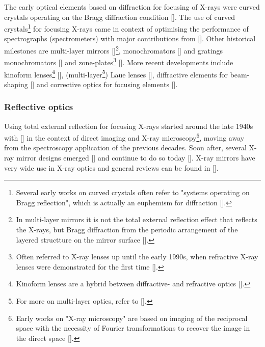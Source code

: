 \begin{refsection}
The early optical elements based on diffraction for focusing of X-rays were curved crystals operating on the Bragg diffraction condition [\cite{Gouy1916,Seemann1916}]. The use of curved crystals\footnote{Several early works on curved crystals often refer to "systems operating on Bragg reflection", which is actually an euphemism for diffraction [\cite{Hart1971}].} for focusing X-rays came in context of optimising the performance of spectrographs (spectrometers) with major contributions from [\cite{Johann1931,Johansson1933,V.Hamos1933, Hamos1937}]. Other historical milestones are multi-layer mirrors [\cite{Gaponov1983,Aristov1986,Underwood1986}]\footnote{In multi-layer mirrors it is not the total external reflection effect that reflects the X-rays, but Bragg diffraction from the periodic arrangement of the layered structture on the mirror surface [\cite{Morawe2010}].}, monochromators [\cite{Smith1941, DuMond1950}] and gratings monochromators [\cite{Namioka1976,McKinney1980,Tonner1980}] and zone-plates\footnote{Often referred to X-ray lenses up until the early 1990s, when refractive X-ray lenses were demonstrated for the first time [\cite{Snigirev1996}].} [\cite{Baez1960,Schmahl1969,Kirz1974}]. More recent developments include kinoform lenses\footnote{Kinoform lenses are a hybrid between diffractive- and refractive optics [\cite{Jordan1970,Ognev2005}].} [\cite{Snigireva2001,Snigireva2001a,David2004}], (multi-layer\footnote{For more on multi-layer optics, refer to [\cite{Aristov1988}].}) Laue lenses [\cite{Maser2004,Kang2005,Liu2005}], diffractive elements for beam-shaping [\cite{Vogt2006, Jefimovs2008, RebernikRibic2017, Rosner2017,Marchesini2019}] and corrective optics for focusing elements [\cite{Probst2020}].


\subsubsection*{Reflective optics}

Using total external reflection for focusing X-rays started around the late 1940s with [\cite{Ehrenberg1947, Kirkpatrick1948, Ehrenberg1949, Kirkpatrick1950}] in the context of direct imaging and X-ray microscopy\footnote{Early works on "X-ray microscopy" are based on imaging of the reciprocal space with the necessity of Fourier transformations to recover the image in the direct space [\cite{Bragg1939,Bragg1942}].}, moving away from the spectroscopy application of the previous decades. Soon after, several X-ray mirror designs emerged [\cite{Wolter1952,Montel1957}] and continue to do so today [\cite{Matsuyama2017,Yamada2019,Yamada2020}]. X-ray mirrors have very wide use in X-ray optics and general reviews can be found in [\cite{Howells1993,Susini1993}].


\end{refsection}
